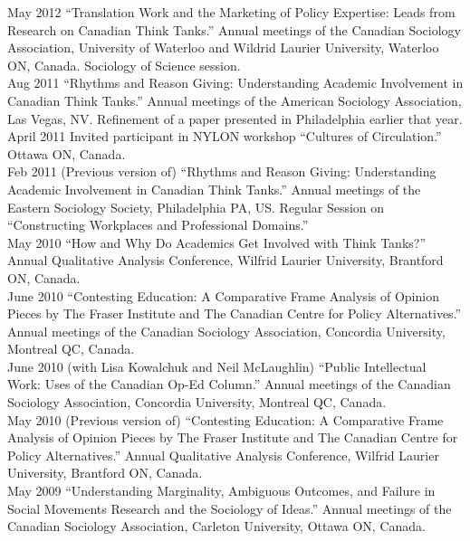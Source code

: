 \documentclass[11pt,usenames,dvipsnames]{article}
\begin{document}
\ind May 2012 ``Translation Work and the Marketing of Policy Expertise: Leads from Research on Canadian Think Tanks.'' Annual meetings of the Canadian Sociology Association, University of Waterloo and Wildrid Laurier University, Waterloo ON, Canada. Sociology of Science session.\\

\ind Aug 2011 ``Rhythms and Reason Giving: Understanding Academic Involvement in Canadian Think Tanks.'' Annual meetings of the American Sociology Association, Las Vegas, NV. Refinement of a paper presented in Philadelphia earlier that year. \\

\ind April 2011 Invited participant in NYLON workshop ``Cultures of Circulation.'' Ottawa ON, Canada.\\

\ind Feb 2011 (Previous version of) ``Rhythms and Reason Giving: Understanding Academic Involvement in Canadian Think Tanks.'' Annual meetings of the Eastern Sociology Society, Philadelphia PA, US. Regular Session on ``Constructing Workplaces and Professional Domains.''\\

\ind May 2010 ``How and Why Do Academics Get Involved with Think Tanks?'' Annual Qualitative Analysis Conference, Wilfrid Laurier University, Brantford ON, Canada.\\

\ind June 2010 ``Contesting Education: A Comparative Frame Analysis of Opinion Pieces by The Fraser Institute and The Canadian Centre for Policy Alternatives.'' Annual meetings  of the Canadian Sociology Association, Concordia University, Montreal QC, Canada.\\

\ind June 2010 (with Lisa Kowalchuk and Neil McLaughlin) ``Public Intellectual Work: Uses of the Canadian Op-Ed Column.'' Annual meetings of the Canadian Sociology Association, Concordia University, Montreal QC, Canada.\\

\ind May 2010 (Previous version of) ``Contesting Education: A Comparative Frame Analysis of Opinion Pieces by The Fraser Institute and The Canadian Centre for Policy Alternatives.'' Annual Qualitative Analysis Conference, Wilfrid Laurier University, Brantford ON, Canada.\\

\ind May 2009 ``Understanding Marginality, Ambiguous Outcomes, and Failure in Social Movements Research and the Sociology of Ideas.'' Annual meetings of the Canadian Sociology Association, Carleton University, Ottawa ON, Canada.\\
\end{document}
